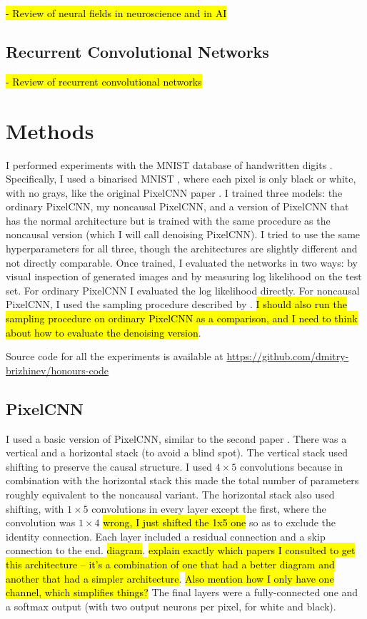 \documentclass[10pt,a4paper]{article}
\begin{document}
\hl{- Review of neural fields in neuroscience and in AI}

\subsection{Recurrent Convolutional Networks}

\hl{- Review of recurrent convolutional networks}
\cite{videopixel}

\section{Methods}

I performed experiments with the MNIST database of handwritten digits \cite{mnist}. Specifically, I used a binarised MNIST \cite{binarisedmnist}, where each pixel is only black or white, with no grays, like the original PixelCNN paper \cite{pixelcnn1}. I trained three models: the ordinary PixelCNN, my noncausal PixelCNN, and a version of PixelCNN that has the normal architecture but is trained with the same procedure as the noncausal version (which I will call denoising PixelCNN). I tried to use the same hyperparameters for all three, though the architectures are slightly different and not directly comparable. Once trained, I evaluated the networks in two ways: by visual inspection of generated images and by measuring log likelihood \cite{??} on the test set. For ordinary PixelCNN I evaluated the log likelihood directly. For noncausal PixelCNN, I used the sampling procedure described by \cite{likelihoodestimation}. \hl{I should also run the sampling procedure on ordinary PixelCNN as a comparison, and I need to think about how to evaluate the denoising version}.

Source code for all the experiments is available at \url{https://github.com/dmitry-brizhinev/honours-code}

\subsection{PixelCNN}

I used a basic version of PixelCNN, similar to the second paper \cite{pixelcnn2}. There was a vertical and a horizontal stack (to avoid a blind spot). The vertical stack used shifting to preserve the causal structure. I used $4\times 5$ convolutions because in combination with the horizontal stack this made the total number of parameters roughly equivalent to the noncausal variant. The horizontal stack also used shifting, with $1\times 5$ convolutions in every layer except the first, where the convolution was $1\times 4$ \hl{wrong, I just shifted the 1x5 one} so as to exclude the identity connection. Each layer included a residual connection and a skip connection to the end. \hl{diagram}. \hl{explain exactly which papers I consulted to get this architecture -- it's a combination of one that had a better diagram and another that had a simpler architecture}. \hl{Also mention how I only have one channel, which simplifies things?} The final layers were a fully-connected one and a softmax output (with two output neurons per pixel, for white and black).
\end{document}
